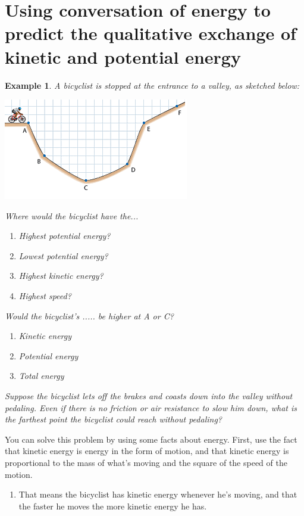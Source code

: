 \documentclass{article}  %
\newtheorem{exmp}{Example}
\begin{document}
\section*{Using conversation of energy to predict the qualitative exchange of kinetic and potential energy}
\begin{exmp}
    A bicyclist is stopped at the entrance to a valley, as sketched below:
    \begin{center}
        \includegraphics{Conservation_Kinetic_Potential}
    \end{center}
    Where would the bicyclist have the...
    \begin{enumerate}
        \item Highest potential energy?
        \item Lowest potential energy?
        \item Highest kinetic energy?
        \item Highest speed?
    \end{enumerate}
    Would the bicyclist's ..... be higher at A or C?
    \begin{enumerate}
        \item Kinetic energy
        \item Potential energy
        \item Total energy
    \end{enumerate}
    Suppose the bicyclist lets off the brakes and coasts down into the valley without pedaling. Even if there is no friction or air resistance to slow him down, what is the farthest point the bicyclist could reach without pedaling?
\end{exmp}
You can solve this problem by using some facts about energy.
\newline
First, use the fact that kinetic energy is energy in the form of motion, and that kinetic energy is proportional to the mass of what's moving and the square of the speed of the motion.
\begin{enumerate}
    \item That means the bicyclist has kinetic energy whenever he's moving, and that the faster he moves the more kinetic energy he has.
\end{enumerate}
\end{document}
